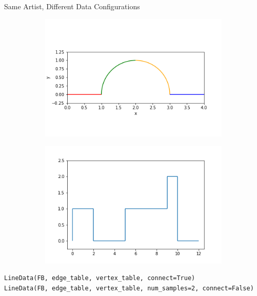 \documentclass[xcolor={dvipsnames}, handout]{beamer}
\begin{document}
\begin{frame}[fragile]{Same Artist, Different Data Configurations}
    \begin{figure}[H]
        \begin{subfigure}{0.49\textwidth}
            \includegraphics[width=\textwidth]{figures/code/linec_1.png}
        \end{subfigure}
        \begin{subfigure}{0.49\textwidth}
            \includegraphics[width=\textwidth]{figures/code/lined_1.png}
        \end{subfigure}
    \end{figure}
\begin{verbatim}
LineData(FB, edge_table, vertex_table, connect=True)
LineData(FB, edge_table, vertex_table, num_samples=2, connect=False)
\end{verbatim}
\end{frame}
\end{document}
